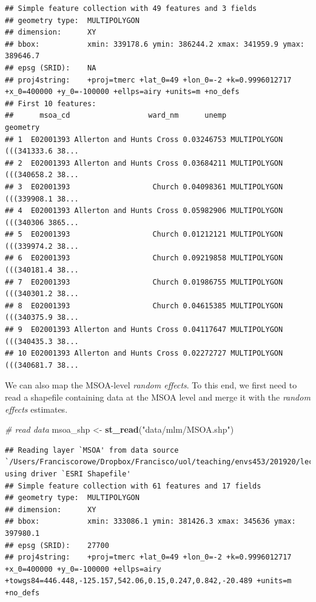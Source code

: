 \documentclass[]{book}
\newenvironment{Shaded}{\begin{snugshade}}{\end{snugshade}}
\newcommand{\KeywordTok}[1]{\textcolor[rgb]{0.13,0.29,0.53}{\textbf{#1}}}
\newcommand{\StringTok}[1]{\textcolor[rgb]{0.31,0.60,0.02}{#1}}
\newcommand{\CommentTok}[1]{\textcolor[rgb]{0.56,0.35,0.01}{\textit{#1}}}
\newcommand{\NormalTok}[1]{#1}
\begin{document}
\begin{verbatim}
## Simple feature collection with 49 features and 3 fields
## geometry type:  MULTIPOLYGON
## dimension:      XY
## bbox:           xmin: 339178.6 ymin: 386244.2 xmax: 341959.9 ymax: 389646.7
## epsg (SRID):    NA
## proj4string:    +proj=tmerc +lat_0=49 +lon_0=-2 +k=0.9996012717 +x_0=400000 +y_0=-100000 +ellps=airy +units=m +no_defs
## First 10 features:
##      msoa_cd                  ward_nm      unemp                       geometry
## 1  E02001393 Allerton and Hunts Cross 0.03246753 MULTIPOLYGON (((341333.6 38...
## 2  E02001393 Allerton and Hunts Cross 0.03684211 MULTIPOLYGON (((340658.2 38...
## 3  E02001393                   Church 0.04098361 MULTIPOLYGON (((339908.1 38...
## 4  E02001393 Allerton and Hunts Cross 0.05982906 MULTIPOLYGON (((340306 3865...
## 5  E02001393                   Church 0.01212121 MULTIPOLYGON (((339974.2 38...
## 6  E02001393                   Church 0.09219858 MULTIPOLYGON (((340181.4 38...
## 7  E02001393                   Church 0.01986755 MULTIPOLYGON (((340301.2 38...
## 8  E02001393                   Church 0.04615385 MULTIPOLYGON (((340375.9 38...
## 9  E02001393 Allerton and Hunts Cross 0.04117647 MULTIPOLYGON (((340435.3 38...
## 10 E02001393 Allerton and Hunts Cross 0.02272727 MULTIPOLYGON (((340681.7 38...
\end{verbatim}

We can also map the MSOA-level \emph{random effects}. To this end, we
first need to read a shapefile containing data at the MSOA level and
merge it with the \emph{random effects} estimates.

\begin{Shaded}
\begin{Highlighting}[]
\CommentTok{# read data}
\NormalTok{msoa_shp <-}\StringTok{ }\KeywordTok{st_read}\NormalTok{(}\StringTok{"data/mlm/MSOA.shp"}\NormalTok{)}
\end{Highlighting}
\end{Shaded}

\begin{verbatim}
## Reading layer `MSOA' from data source `/Users/Franciscorowe/Dropbox/Francisco/uol/teaching/envs453/201920/lectures/san/data/mlm/MSOA.shp' using driver `ESRI Shapefile'
## Simple feature collection with 61 features and 17 fields
## geometry type:  MULTIPOLYGON
## dimension:      XY
## bbox:           xmin: 333086.1 ymin: 381426.3 xmax: 345636 ymax: 397980.1
## epsg (SRID):    27700
## proj4string:    +proj=tmerc +lat_0=49 +lon_0=-2 +k=0.9996012717 +x_0=400000 +y_0=-100000 +ellps=airy +towgs84=446.448,-125.157,542.06,0.15,0.247,0.842,-20.489 +units=m +no_defs
\end{verbatim}
\end{document}
